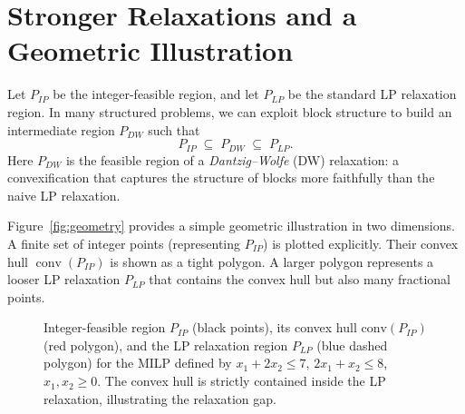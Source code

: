 \documentclass[11pt]{article}
\begin{document}
\section{Stronger Relaxations and a Geometric Illustration}

Let $P_{IP}$ be the integer-feasible region,
and let $P_{LP}$ be the standard LP relaxation region.
In many structured problems, we can exploit block structure to build an
intermediate region $P_{DW}$ such that
\[
    P_{IP} \;\subseteq\; P_{DW} \;\subseteq\; P_{LP}.
\]
Here $P_{DW}$ is the feasible region of a \emph{Dantzig--Wolfe} (DW) relaxation:
a convexification that captures the structure of blocks more faithfully than
the naive LP relaxation.

Figure~\ref{fig:geometry} provides a simple geometric illustration in two
dimensions.
A finite set of integer points (representing $P_{IP}$) is plotted explicitly.
Their convex hull $\operatorname{conv}(P_{IP})$ is shown as a tight polygon.
A larger polygon represents a looser LP relaxation $P_{LP}$ that contains the
convex hull but also many fractional points.
\begin{figure}[t]
\centering
{}

\caption{
Integer-feasible region $P_{IP}$ (black points), its convex hull $\mathrm{conv}(P_{IP})$ (red polygon),
and the LP relaxation region $P_{LP}$ (blue dashed polygon) for the MILP defined by
$x_1 + 2x_2 \le 7$, $2x_1 + x_2 \le 8$, $x_1,x_2 \ge 0$.
The convex hull is strictly contained inside the LP relaxation, illustrating the relaxation gap.
}
\end{figure}
\end{document}
